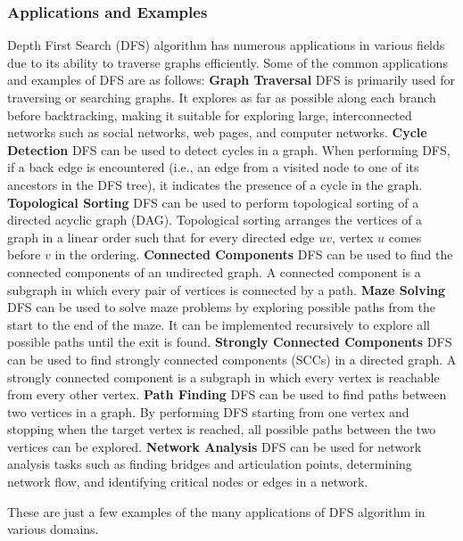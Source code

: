 \documentclass[12pt]{book} %
\begin{document}
\subsubsection{Applications and Examples}

Depth First Search (DFS) algorithm has numerous applications in various fields due to its ability to traverse graphs efficiently. Some of the common applications and examples of DFS are as follows:
\FloatBarrier
\textbf{Graph Traversal}
\FloatBarrier
DFS is primarily used for traversing or searching graphs. It explores as far as possible along each branch before backtracking, making it suitable for exploring large, interconnected networks such as social networks, web pages, and computer networks.
\FloatBarrier
\textbf{Cycle Detection}
\FloatBarrier
DFS can be used to detect cycles in a graph. When performing DFS, if a back edge is encountered (i.e., an edge from a visited node to one of its ancestors in the DFS tree), it indicates the presence of a cycle in the graph.
\FloatBarrier
\textbf{Topological Sorting}
\FloatBarrier
DFS can be used to perform topological sorting of a directed acyclic graph (DAG). Topological sorting arranges the vertices of a graph in a linear order such that for every directed edge $uv$, vertex $u$ comes before $v$ in the ordering.
\FloatBarrier
\textbf{Connected Components}
\FloatBarrier
DFS can be used to find the connected components of an undirected graph. A connected component is a subgraph in which every pair of vertices is connected by a path.
\FloatBarrier
\textbf{Maze Solving}
\FloatBarrier
DFS can be used to solve maze problems by exploring possible paths from the start to the end of the maze. It can be implemented recursively to explore all possible paths until the exit is found.
\FloatBarrier
\textbf{Strongly Connected Components}
\FloatBarrier
DFS can be used to find strongly connected components (SCCs) in a directed graph. A strongly connected component is a subgraph in which every vertex is reachable from every other vertex.
\FloatBarrier
\textbf{Path Finding}
\FloatBarrier
DFS can be used to find paths between two vertices in a graph. By performing DFS starting from one vertex and stopping when the target vertex is reached, all possible paths between the two vertices can be explored.
\FloatBarrier
\textbf{Network Analysis}
\FloatBarrier
DFS can be used for network analysis tasks such as finding bridges and articulation points, determining network flow, and identifying critical nodes or edges in a network.

These are just a few examples of the many applications of DFS algorithm in various domains.
\FloatBarrier
\end{document}
